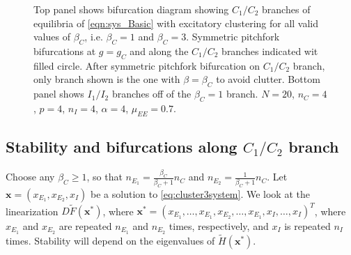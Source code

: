 \documentclass[11pt,reqno]{amsart}
\newcommand{\xvec}{\mathbf{x}}
\begin{document}
\begin{figure}
\begin{tabular}{cc}
    \end{tabular}
    \caption{Top panel shows bifurcation diagram showing $C_1/C_2$ branches of equilibria of \cref{eqn:sys_Basic} with excitatory clustering for all valid values of $\beta_C$, i.e. $\beta_C =1$ and $\beta_C=3$. Symmetric pitchfork bifurcations at $g = g_C$ and along the $C_1/C_2$ branches indicated wit filled circle. After symmetric pitchfork bifurcation on $C_1/C_2$ branch, only branch shown is the one with $\beta=\beta_C$ to avoid clutter. Bottom panel shows $I_1/I_2$ branches off of the $\beta_C = 1$ branch. $N = 20$, $n_C = 4$, $p = 4$, $n_I = 4$, $\alpha = 4$, $\mu_{EE} = 0.7$.}
    \label{fig:clusterBD1}
\end{figure}

\subsection{Stability and bifurcations along $C_1/C_2$ branch}

Choose any $\beta_C \geq 1$, so that $n_{E_1} = \frac{\beta_C}{\beta_C+1}n_C$ and $n_{E_2} = \frac{1}{\beta_C+1}n_C$. Let $\xvec = (x_{E_1}, x_{E_2}, x_{I})$ be a solution to \cref{eq:cluster3system}. We look at the linearization $D\tilde{F}(\xvec^*)$, where $\xvec^* = (x_{E_1}, \dots, x_{E_1}, x_{E_2}, \dots, x_{E_1}, x_{I}, \dots, x_{I})^T$, where $x_{E_1}$ and $x_{E_2}$ are repeated $n_{E_1}$ and $n_{E_2}$ times, respectively, and $x_I$ is repeated $n_I$ times. Stability will depend on the eigenvalues of $\tilde{H}(\xvec^*)$. 
\end{document}
